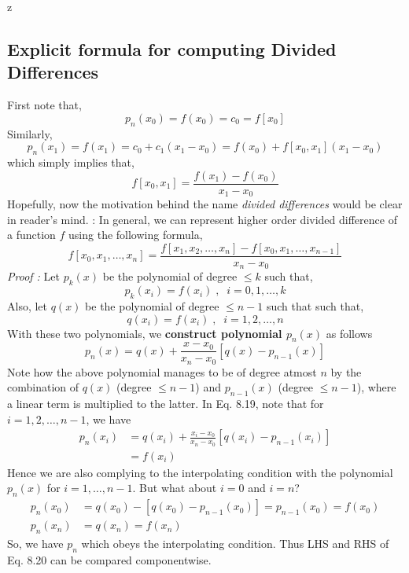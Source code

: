 z\documentclass[a4paper,12pt,twoside]{book}
\newcommand{\nll}[0]{\newline\newline}
\newcommand{\tit}[1]{\textit{#1}}
\newcommand{\theor}[1]{\boxed{\textbf{\textit{Theorem \thechapter.#1}}}}
\begin{document}
\subsection{Explicit formula for computing Divided Differences}
First note that,
\[ p_n(x_0) = f(x_0) = c_0 = f[x_0] \]
Similarly,
\[p_n(x_1) = f(x_1) = c_0 + c_1(x_1 - x_0) = f(x_0) + f[x_0,x_1](x_1-x_0)\]
which simply implies that,
\[f[x_0 , x_1] = \frac{f(x_1) - f(x_0)}{x_1 -x_0}\]
Hopefully, now the motivation behind the name \tit{divided differences} would be clear in reader's mind.
\nll
\theor{7}  : In general, we can represent higher order divided difference of a function $f$ using the following formula,
\begin{equation}
    f[x_0,x_1,\dots,x_n] = \frac{f[x_1,x_2,\dots,x_n] - f[x_0,x_1,\dots,x_{n-1}]}{x_n-x_0}
\end{equation}
\tit{Proof :} Let $p_k(x)$ be the polynomial of degree $\le k$ such that,
\[p_k(x_i) = f(x_i)\;,\;\; i = 0,1,\dots,k\]
Also, let $q(x)$ be the polynomial of degree $\le n-1$ such that such that,
\[q(x_i) = f(x_i)\;,\;\;i=1,2,\dots,n\]
With these two polynomials, we \textbf{construct polynomial $p_n(x)$} as follows
\begin{equation}
    p_n(x) = q(x) + \frac{x-x_0}{x_n-x_0} \left[ q(x) - p_{n-1}(x) \right]
\end{equation}
Note how the  above polynomial manages to be of degree atmost $n$ by the combination of $q(x)$ (degree $\le n-1$) and $p_{n-1}(x)$ (degree $\le n-1$), where a linear term is multiplied to the latter.
\nll
In Eq. 8.19, note that for $i=1,2,\dots,n-1$, we have
\begin{equation}
    \begin{split}
        p_n(x_i) &= q(x_i) + \frac{x_i - x_0}{x_n - x_0} \left[ q(x_i) - p_{n-1}(x_i) \right]\\
        &= f(x_i)
    \end{split}
\end{equation}
Hence we are also complying to the interpolating condition with the polynomial $p_n(x)$ for $i=1,\dots,n-1$. But what about $i=0$ and $i=n$?
\begin{equation}
    \begin{split}
        p_n(x_0) &= q(x_0) - [q(x_0) - p_{n-1}(x_0)] = p_{n-1}(x_0) = f(x_0)\\
        p_n(x_n) &= q(x_n) = f(x_n)
    \end{split}
\end{equation}
\nll
So, we have $p_n$ which obeys the interpolating condition. Thus LHS and RHS of Eq. 8.20 can be compared componentwise.
\end{document}
